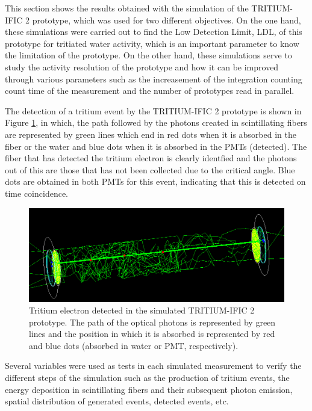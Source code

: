 This section shows the results obtained with the simulation of the TRITIUM-IFIC 2 prototype, which was used for two different objectives. On the one hand, these simulations were carried out to find the Low Detection Limit, LDL, of this prototype for tritiated water activity, which is an important parameter to know the limitation of the prototype. On the other hand, these simulations serve to study the activity resolution of the prototype and  how it can be improved through various parameters such as the increasement of the integration counting count time of the measurement and the number of prototypes read in parallel.

The detection of a tritium event by the TRITIUM-IFIC 2 prototype is shown in Figure \ref{fig:TritiumEventDetectedInSimulatedPrototype}, in which, the path followed by the photons created in scintillating fibers are represented by green lines which end in red dots when it is absorbed in the fiber or the water and blue dots when it is absorbed in the PMTs (detected). The fiber that has detected the tritium electron is clearly identfied and the photons out of this are those that has not been collected due to the critical angle. Blue dots are obtained in both PMTs for this event, indicating that this is detected on time coincidence.

\begin{figure}[hbtp]
\centering
\includegraphics[scale=0.35]{Figures/8SimulationsResults/82TRITIUMMonitor/821TRITIUMIFIC2/EventDetectedInTRITIUMIFIC2.png}
\caption{Tritium electron detected in the simulated TRITIUM-IFIC 2 prototype. The path of the optical photons is represented by green lines and the position in which it is absorbed is represented by red and blue dots (absorbed in water or PMT, respectively).\label{fig:TritiumEventDetectedInSimulatedPrototype}}
\end{figure}

Several variables were used as tests in each simulated measurement to verify the different steps of the simulation such as the production of tritium events, the energy deposition in scintillating fibers and their subsequent photon emission, spatial distribution of generated events, detected events, etc. %

